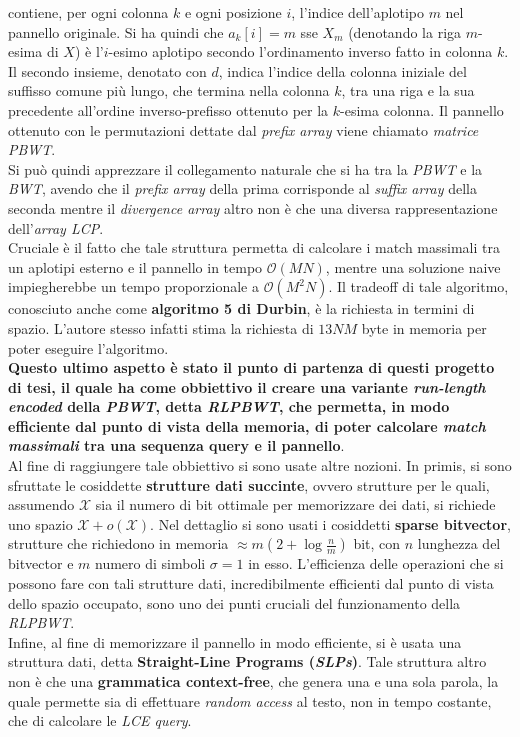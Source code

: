\documentclass[a4paper,11pt, oneside]{article}
\begin{document}
contiene, per ogni colonna $k$ e ogni posizione $i$, l'indice dell'aplotipo $m$
nel pannello originale. Si ha quindi che $a_k[i]=m$ sse $X_m$ 
(denotando la riga $m$-esima di $X$) è l'$i$-esimo aplotipo secondo
l'ordinamento inverso fatto in colonna $k$. Il secondo insieme, denotato con
$d$, indica l'indice della colonna iniziale del suffisso comune più lungo, che
termina nella colonna $k$, tra una riga e la sua precedente all'ordine
inverso-prefisso ottenuto per la $k$-esima colonna. Il pannello ottenuto con le
permutazioni dettate dal \textit{prefix array} viene chiamato \textit{matrice
  PBWT}.\\
Si può quindi apprezzare il collegamento naturale che si ha tra la \textit{PBWT}
e la \textit{BWT}, avendo che il \textit{prefix array} della prima corrisponde
al \textit{suffix array} della seconda mentre il \textit{divergence array} altro
non è che una diversa rappresentazione dell'\textit{array LCP}. \\
Cruciale è il fatto che tale struttura permetta di calcolare i match massimali
tra un aplotipi esterno e il pannello in tempo $\mathcal{O}(MN)$, mentre una
soluzione naive impiegherebbe un tempo proporzionale a $\mathcal{O}(M^2N)$. Il
tradeoff di tale algoritmo, conosciuto anche come \textbf{algoritmo 5 di
  Durbin}, è la richiesta in termini di spazio. L'autore stesso infatti stima la
richiesta di $13NM$ byte in memoria per poter eseguire l'algoritmo.\\
\textbf{Questo ultimo aspetto è stato il punto di partenza di questi progetto di
tesi, il quale ha come obbiettivo il creare una variante \textit{run-length
  encoded} della \textit{PBWT}, detta \textit{RLPBWT}, che permetta, in modo
efficiente dal punto di vista della memoria, di poter calcolare \textit{match
  massimali} tra una sequenza query e il pannello}.\\
Al fine di raggiungere tale obbiettivo si sono usate altre nozioni. In primis,
si sono sfruttate le cosiddette \textbf{strutture dati succinte}, ovvero
strutture per le quali, assumendo $\mathcal{X}$ sia il numero di bit ottimale
per memorizzare dei dati, si richiede uno spazio
$\mathcal{X}+o(\mathcal{X})$. Nel dettaglio si sono usati i cosiddetti
\textbf{sparse bitvector}, strutture che richiedono in memoria $\approx
m\left(2+\log\frac{n}{m}\right)$ bit, con $n$ lunghezza del bitvector e $m$
numero di simboli $\sigma=1$ in esso. L'efficienza delle operazioni che si
possono fare con tali strutture dati, incredibilmente efficienti dal punto di
vista dello spazio occupato, sono uno dei punti cruciali del funzionamento della
\textit{RLPBWT}.\\
Infine, al fine di memorizzare il pannello in modo efficiente, si è usata una
struttura dati, detta \textbf{Straight-Line Programs (\textit{SLPs})}. Tale
struttura altro non è che una \textbf{grammatica context-free}, che
genera una e una sola parola, la quale permette sia di effettuare \textit{random
access} al testo, non in tempo costante, che di calcolare le \textit{LCE
query}. 
\end{document}
